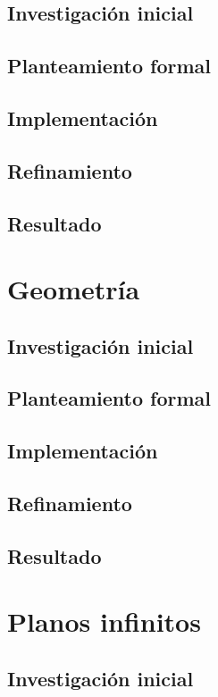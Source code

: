 \subsection{Investigación inicial}
\subsection{Planteamiento formal}
\subsection{Implementación}
\subsection{Refinamiento}
\subsection{Resultado}

\section{Geometría}

\subsection{Investigación inicial}
\subsection{Planteamiento formal}
\subsection{Implementación}
\subsection{Refinamiento}
\subsection{Resultado}

\section{Planos infinitos}

\subsection{Investigación inicial}
